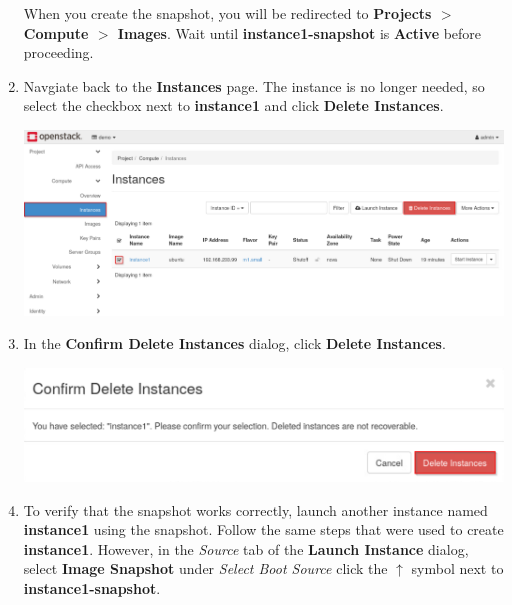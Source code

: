 \documentclass[letterpaper, 12pt]{article}
\begin{document}
\begin{enumerate}
    \begin{stopbox}
        When you create the snapshot, you will be redirected to \textbf{Projects $>$ Compute $>$ Images}. Wait until
        \textbf{instance1-snapshot} is \textbf{Active} before proceeding.
    \end{stopbox}

    \item Navgiate back to the \textbf{Instances} page. The instance is no longer needed, so select the checkbox next to
    \textbf{instance1} and click \textbf{Delete Instances}.

    \begin{center}
        \includegraphics[width=\linewidth]{images/part1/step15.png}
    \end{center}

    \item In the \textbf{Confirm Delete Instances} dialog, click \textbf{Delete Instances}.

    \begin{center}
        \includegraphics[width=\linewidth]{images/part1/step16.png}
    \end{center}

    \item To verify that the snapshot works correctly, launch another instance named \textbf{instance1} using the
    snapshot. Follow the same steps that were used to create \textbf{instance1}. However, in the \textit{Source} tab of
    the \textbf{Launch Instance} dialog, select \textbf{Image Snapshot} under \textit{Select Boot Source} click the
    $\uparrow$ symbol next to \textbf{instance1-snapshot}.


\end{enumerate}
\end{document}
